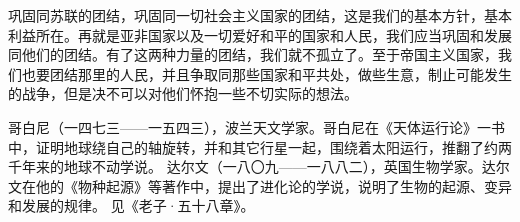巩固同苏联的团结，巩固同一切社会主义国家的团结，这是我们的基本方针，基本利益所在。再就是亚非国家以及一切爱好和平的国家和人民，我们应当巩固和发展同他们的团结。有了这两种力量的团结，我们就不孤立了。至于帝国主义国家，我们也要团结那里的人民，并且争取同那些国家和平共处，做些生意，制止可能发生的战争，但是决不可以对他们怀抱一些不切实际的想法。


\begin{maonote}
哥白尼（一四七三——一五四三），波兰天文学家。哥白尼在《天体运行论》一书中，证明地球绕自己的轴旋转，并和其它行星一起，围绕着太阳运行，推翻了约两千年来的地球不动学说。
达尔文（一八〇九——一八八二），英国生物学家。达尔文在他的《物种起源》等著作中，提出了进化论的学说，说明了生物的起源、变异和发展的规律。
见《老子·五十八章》。
\end{maonote}
